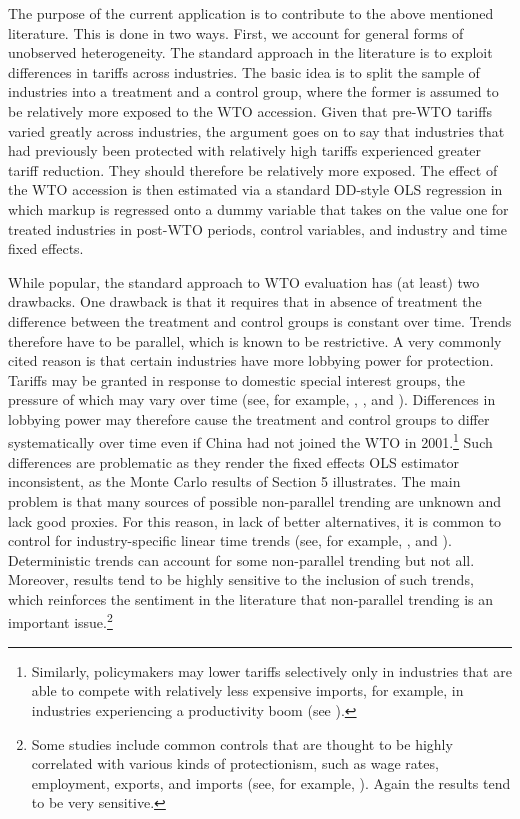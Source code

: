 \documentclass[12pt,fleqn]{article}
\begin{document}
The purpose of the current application is to contribute to the above mentioned literature. This is done in two ways. First, we account for general forms of unobserved heterogeneity. The standard approach in the literature is to exploit differences in tariffs across industries. The basic idea is to split the sample of industries into a treatment and a control group, where the former is assumed to be relatively more exposed to the WTO accession. Given that pre-WTO tariffs varied greatly across industries, the argument goes on to say that industries that had previously been protected with relatively high tariffs experienced greater tariff reduction. They should therefore be relatively more exposed. The effect of the WTO accession is then estimated via a standard DD-style OLS regression in which markup is regressed onto a dummy variable that takes on the value one for treated industries in post-WTO periods, control variables, and industry and time fixed effects.

While popular, the standard approach to WTO evaluation has (at least) two drawbacks. One drawback is that it requires that in absence of treatment the difference between the treatment and control groups is constant over time. Trends therefore have to be parallel, which is known to be restrictive. A very commonly cited reason is that certain industries have more lobbying power for protection. Tariffs may be granted in response to domestic special interest groups, the pressure of which may vary over time (see, for example, \citealp{Fan_etal_2018}, \citealp{Deng_etal_2018}, and \citealp{Xiang_etal_2017}). Differences in lobbying power may therefore cause the treatment and control groups to differ systematically over time even if China had not joined the WTO in 2001.\footnote{Similarly, policymakers may lower tariffs selectively only in industries that are able to compete with relatively less expensive imports, for example, in industries experiencing a productivity boom (see \citealp{Brandt_etal_2017}).} Such differences are problematic as they render the fixed effects OLS estimator inconsistent, as the Monte Carlo results of Section 5 illustrates. The main problem is that many sources of possible non-parallel trending are unknown and lack good proxies. For this reason, in lack of better alternatives, it is common to control for industry-specific linear time trends (see, for example, \citealp{Liu_Qiu_2016}, and \citealp{Mao_Xu_2019}). Deterministic trends can account for some non-parallel trending but not all. Moreover, results tend to be highly sensitive to the inclusion of such trends, which reinforces the sentiment in the literature that non-parallel trending is an important issue.\footnote{Some studies include common controls that are thought to be highly correlated with various kinds of protectionism, such as wage rates, employment, exports, and imports (see, for example, \citealp{Hsu_etal_2020}). Again the results tend to be very sensitive.}
\end{document}

